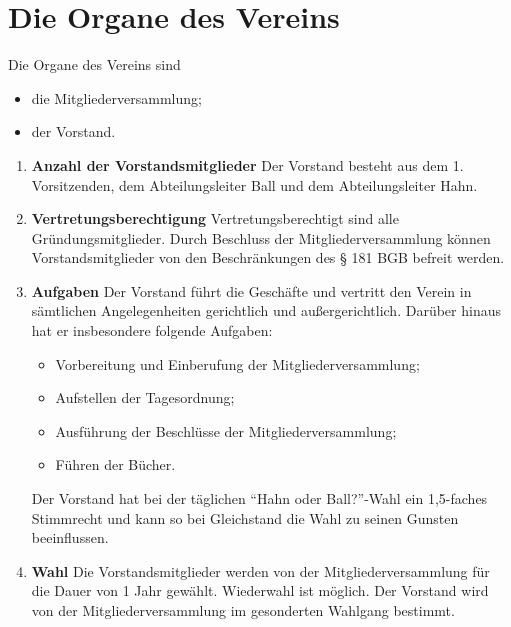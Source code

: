 \documentclass{scrartcl}
\begin{document}
    \section{Die Organe des Vereins}
        Die Organe des Vereins sind
        \begin{itemize}
            \item die Mitgliederversammlung;
            \item der Vorstand.
        \end{itemize}
        \begin{enumerate}
            \item \textbf{Anzahl der Vorstandsmitglieder} \newline
                Der Vorstand besteht aus dem 1. Vorsitzenden, dem Abteilungsleiter Ball und dem Abteilungsleiter Hahn.
            \item \textbf{Vertretungsberechtigung} \newline
                Vertretungsberechtigt sind alle Gründungsmitglieder. 
                Durch Beschluss der Mitgliederversammlung können Vorstandsmitglieder von den Beschränkungen des § 181 BGB befreit werden.
            \item \textbf{Aufgaben} \newline
                Der Vorstand führt die Geschäfte und vertritt den Verein in sämtlichen Angelegenheiten
                gerichtlich und außergerichtlich. Darüber hinaus hat er insbesondere folgende Aufgaben:
                \begin{itemize}
                    \item Vorbereitung und Einberufung der Mitgliederversammlung;
                    \item Aufstellen der Tagesordnung;
                    \item Ausführung der Beschlüsse der Mitgliederversammlung;
                    \item Führen der Bücher.
                \end{itemize}
                Der Vorstand hat bei der täglichen ``Hahn oder Ball?''-Wahl ein 1,5-faches Stimmrecht und kann so bei Gleichstand die Wahl zu seinen Gunsten beeinflussen.
            \item \textbf{Wahl} \newline
                Die Vorstandsmitglieder werden von der Mitgliederversammlung für die Dauer von 1 Jahr
                gewählt. Wiederwahl ist möglich. Der Vorstand wird von der
                Mitgliederversammlung im gesonderten Wahlgang bestimmt. 

\end{enumerate}
\end{document}
